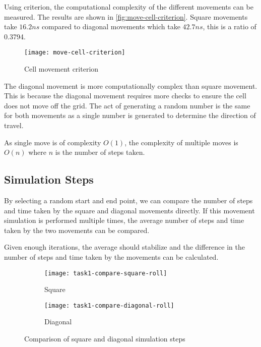 Using criterion, the computational complexity of the different movements can be measured.
The results are shown in \autoref{fig:move-cell-criterion}.
Square movements take $16.2ns$ compared to diagonal movements which take $42.7ns$, this is a ratio of 0.3794.

\begin{figure}[ht]
    \centering
    \texttt{[image: move-cell-criterion]}
    \caption[Cell movement criterion]{Cell movement criterion}
    \label{fig:move-cell-criterion}
\end{figure}

The diagonal movement is more computationally complex than square movement.
This is because the diagonal movement requires more checks to ensure the cell does not move off the grid.
The act of generating a random number is the same for both movements as a single number is generated to determine the direction of travel.

As single move is of complexity $O(1)$, the complexity of multiple moves is $O(n)$ where $n$ is the number of steps taken.

\clearpage

\subsection{Simulation Steps}

By selecting a random start and end point, we can compare the number of steps and time taken by the square and diagonal movements directly.
If this movement simulation is performed multiple times, the average number of steps and time taken by the two movements can be compared.

Given enough iterations, the average should stabilize and the difference in the number of steps and time taken by the movements can be calculated.

\begin{figure}[ht]
    \centering
    \begin{subfigure}{\textwidth}
        \texttt{[image: task1-compare-square-roll]}
        \caption[Square]{Square}
        \label{fig:task1-compare-square-roll}
    \end{subfigure}

    \begin{subfigure}{\textwidth}
        \texttt{[image: task1-compare-diagonal-roll]}
        \caption[Diagonal]{Diagonal}
        \label{fig:task1-compare-diagonal-roll}
    \end{subfigure}

    \caption[Comparison of square and diagonal simulation steps]{Comparison of square and diagonal simulation steps}
    \label{fig:task1-compare-roll}
\end{figure}

